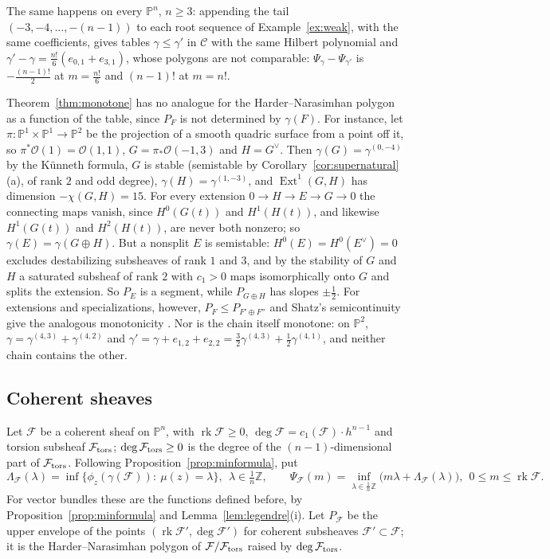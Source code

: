 \documentclass[11pt]{amsart}
\theoremstyle{definition}
\theoremstyle{remark}
\newcommand{\PP}{\mathbb{P}}
\newcommand{\ZZ}{\mathbb{Z}}
\newcommand{\OO}{\mathcal{O}}
\newcommand{\cF}{\mathcal{F}}
\newcommand{\CC}{\mathcal{C}}
\DeclareMathOperator{\rk}{rk}
\DeclareMathOperator{\Ext}{Ext}
\begin{document}
The same happens on every $\PP^n$, $n\ge3$: appending the tail $(-3,-4,\dots,-(n-1))$ to each root sequence of Example~\ref{ex:weak}, with the same coefficients, gives tables $\gamma\le\gamma'$ in $\CC$ with the same Hilbert polynomial and $\gamma'-\gamma=\frac{n!}6(e_{0,1}+e_{3,1})$, whose polygons are not comparable: $\Psi_\gamma-\Psi_{\gamma'}$ is $-\frac{(n-1)!}2$ at $m=\frac{n!}6$ and $(n-1)!$ at $m=n!$.

Theorem~\ref{thm:monotone} has no analogue for the Harder--Narasimhan polygon as a function of the table, since $P_F$ is not determined by $\gamma(F)$. For instance, let $\pi\colon\PP^1\times\PP^1\to\PP^2$ be the projection of a smooth quadric surface from a point off it, so $\pi^*\OO(1)=\OO(1,1)$, $G=\pi_*\OO(-1,3)$ and $H=G^\vee$. Then $\gamma(G)=\gamma^{(0,-4)}$ by the Künneth formula, $G$ is stable (semistable by Corollary~\ref{cor:supernatural}(a), of rank $2$ and odd degree), $\gamma(H)=\gamma^{(1,-3)}$, and $\Ext^1(G,H)$ has dimension $-\chi(G,H)=15$. For every extension $0\to H\to E\to G\to0$ the connecting maps vanish, since $H^0(G(t))$ and $H^1(H(t))$, and likewise $H^1(G(t))$ and $H^2(H(t))$, are never both nonzero; so $\gamma(E)=\gamma(G\oplus H)$. But a nonsplit $E$ is semistable: $H^0(E)=H^0(E^\vee)=0$ excludes destabilizing subsheaves of rank $1$ and $3$, and by the stability of $G$ and $H$ a saturated subsheaf of rank $2$ with $c_1>0$ maps isomorphically onto $G$ and splits the extension. So $P_E$ is a segment, while $P_{G\oplus H}$ has slopes $\pm\frac12$. For extensions and specializations, however, $P_F\le P_{F'\oplus F''}$ and Shatz's semicontinuity give the analogous monotonicity \cite{Sh77}. Nor is the chain itself monotone: on $\PP^2$, $\gamma=\gamma^{(4,3)}+\gamma^{(4,2)}$ and $\gamma'=\gamma+e_{1,2}+e_{2,2}=\frac32\gamma^{(4,3)}+\frac12\gamma^{(4,1)}$, and neither chain contains the other.

\subsection{Coherent sheaves}\label{sec:coherent}
Let $\cF$ be a coherent sheaf on $\PP^n$, with $\rk\cF\ge0$, $\deg\cF=c_1(\cF)\cdot h^{n-1}$ and torsion subsheaf $\cF_{\rm tors}$; $\deg\cF_{\rm tors}\ge0$ is the degree of the $(n-1)$-dimensional part of $\cF_{\rm tors}$. Following Proposition~\ref{prop:minformula}, put
\[
\Lambda_\cF(\lambda)=\inf\big\{\phi_z(\gamma(\cF)):\ \mu(z)=\lambda\big\},\ \ \lambda\in\tfrac1n\ZZ,\qquad \Psi_\cF(m)=\inf_{\lambda\in\frac1n\ZZ}\big(m\lambda+\Lambda_\cF(\lambda)\big),\ \ 0\le m\le\rk\cF .
\]
For vector bundles these are the functions defined before, by Proposition~\ref{prop:minformula} and Lemma~\ref{lem:legendre}(i). Let $P_\cF$ be the upper envelope of the points $(\rk\cF',\deg\cF')$ for coherent subsheaves $\cF'\subset\cF$; it is the Harder--Narasimhan polygon of $\cF/\cF_{\rm tors}$ raised by $\deg\cF_{\rm tors}$.
\end{document}

